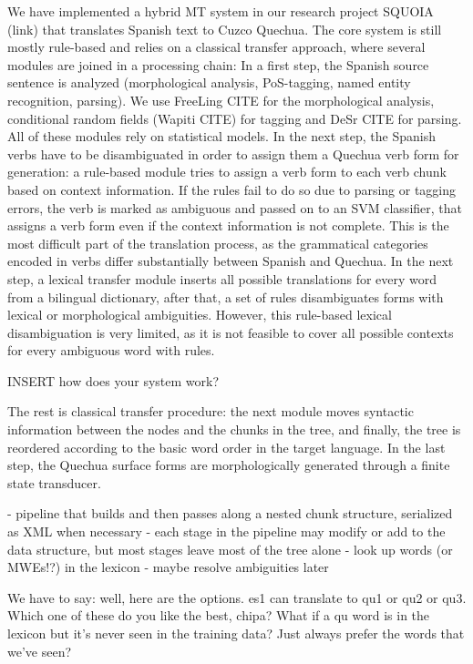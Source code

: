 \documentclass[10pt, a4paper]{article}
\begin{document}
We have implemented a hybrid MT system in our research project SQUOIA (link)
that translates Spanish text to Cuzco Quechua. The core system is still mostly
rule-based and relies on a classical transfer approach, where several modules
are joined in a processing chain: In a first step, the Spanish source sentence
is analyzed (morphological analysis, PoS-tagging, named entity recognition,
parsing). We use FreeLing CITE for the morphological analysis, conditional
random fields (Wapiti CITE) for tagging and DeSr CITE for parsing. All of these
modules rely on statistical models. In the next step, the Spanish verbs have to
be disambiguated in order to assign them a Quechua verb form for generation: a
rule-based module tries to assign a verb form to each verb chunk based on
context information. If the rules fail to do so due to parsing or tagging
errors, the verb is marked as ambiguous and passed on to an SVM classifier,
that assigns a verb form even if the context information is not complete. This
is the most difficult part of the translation process, as the grammatical
categories encoded in verbs differ substantially between Spanish and Quechua.
In the next step, a lexical transfer module inserts all possible translations
for every word from a bilingual dictionary, after that, a set of rules
disambiguates forms with lexical or morphological ambiguities. However, this
rule-based lexical disambiguation is very limited, as it is not feasible to
cover all possible contexts for every ambiguous word with rules.

INSERT how does your system work?

The rest is classical transfer procedure: the next module moves syntactic
information between the nodes and the chunks in the tree, and finally, the tree
is reordered according to the basic word order in the target language. In the
last step, the Quechua surface forms are morphologically generated through a
finite state transducer.



- pipeline that builds and then passes along a nested chunk structure, serialized as XML when necessary
- each stage in the pipeline may modify or add to the data structure, but most stages leave most of the tree alone
- look up words (or MWEs!?) in the lexicon
- maybe resolve ambiguities later


We have to say: well, here are the options. es1 can translate to qu1 or qu2 or
qu3. Which one of these do you like the best, chipa?
What if a qu word is in the lexicon but it's never seen in the training data?
Just always prefer the words that we've seen?
\end{document}

